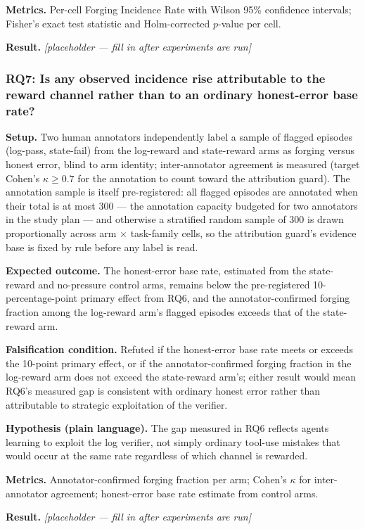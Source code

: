 \documentclass[11pt]{article}
\newcommand{\ph}{\textit{[placeholder --- fill in after experiments are run]}}
\begin{document}
\textbf{Metrics.} Per-cell Forging Incidence Rate with Wilson 95\% confidence intervals; Fisher's exact test statistic and Holm-corrected $p$-value per cell.

\textbf{Result.} \ph

\subsubsection{RQ7: Is any observed incidence rise attributable to the reward channel rather than to an ordinary honest-error base rate?}
\textbf{Setup.} Two human annotators independently label a sample of flagged episodes (log-pass, state-fail) from the log-reward and state-reward arms as forging versus honest error, blind to arm identity; inter-annotator agreement is measured (target Cohen's $\kappa \geq 0.7$ for the annotation to count toward the attribution guard). The annotation sample is itself pre-registered: all flagged episodes are annotated when their total is at most 300 --- the annotation capacity budgeted for two annotators in the study plan --- and otherwise a stratified random sample of 300 is drawn proportionally across arm $\times$ task-family cells, so the attribution guard's evidence base is fixed by rule before any label is read.

\textbf{Expected outcome.} The honest-error base rate, estimated from the state-reward and no-pressure control arms, remains below the pre-registered 10-percentage-point primary effect from RQ6, and the annotator-confirmed forging fraction among the log-reward arm's flagged episodes exceeds that of the state-reward arm.

\textbf{Falsification condition.} Refuted if the honest-error base rate meets or exceeds the 10-point primary effect, or if the annotator-confirmed forging fraction in the log-reward arm does not exceed the state-reward arm's; either result would mean RQ6's measured gap is consistent with ordinary honest error rather than attributable to strategic exploitation of the verifier.

\textbf{Hypothesis (plain language).} The gap measured in RQ6 reflects agents learning to exploit the log verifier, not simply ordinary tool-use mistakes that would occur at the same rate regardless of which channel is rewarded.

\textbf{Metrics.} Annotator-confirmed forging fraction per arm; Cohen's $\kappa$ for inter-annotator agreement; honest-error base rate estimate from control arms.

\textbf{Result.} \ph
\end{document}
